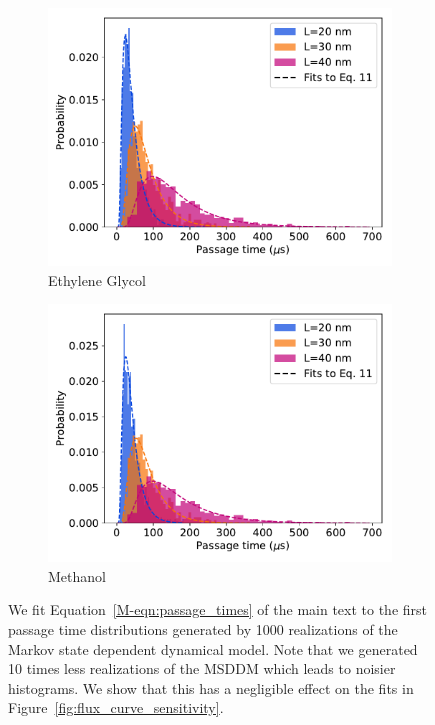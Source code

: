 \documentclass{article}
\begin{document}
\begin{figure}
\begin{subfigure}{0.45\textwidth}
  \includegraphics[width=\textwidth]{msddm_fpt_distributions_GCL.pdf}
  \caption{Ethylene Glycol}\label{fig:GCL_msddm_fpt_distributions}
  \end{subfigure}
  \begin{subfigure}{0.45\textwidth}
  \includegraphics[width=\textwidth]{msddm_fpt_distributions_MET.pdf}
  \caption{Methanol}\label{fig:MET_msddm_fpt_distributions}
  \end{subfigure}
  \caption{We fit Equation~\ref{M-eqn:passage_times} of the main text to the
  first passage time distributions generated by 1000 realizations of the 
  Markov state dependent dynamical model. Note that we generated 10 times less
  realizations of the MSDDM which leads to noisier histograms. We show that
  this has a negligible effect on the fits in Figure~\ref{fig:flux_curve_sensitivity}.}\label{fig:msddm_fpt_fits}
  \end{figure}
\end{document}
